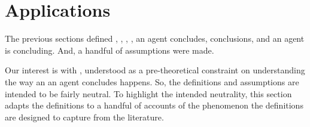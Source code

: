 





\section{Applications}
\label{sec:compatibility}


\begin{note}
  The previous sections defined , , , ,  an agent concludes, conclusions, and  an agent is concluding.
  And, a handful of assumptions were made.

  Our interest is with \issueInclusion{}, understood as a pre-theoretical constraint on understanding the way an \eiw{} an agent concludes happens.
  So, the definitions and assumptions are intended to be fairly neutral.
  To highlight the intended neutrality, this section adapts the definitions to a handful of accounts of the phenomenon the definitions are designed to capture from the literature.
\end{note}



